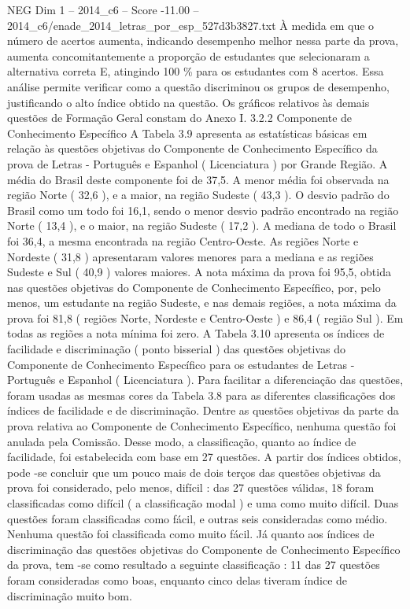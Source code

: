 \begin{textsample}{NEG Dim 1 – 2014\_c6 – Score -11.00 – 2014\_c6/enade\_2014\_letras\_por\_esp\_527d3b3827.txt}
À medida em que o número de acertos aumenta, indicando desempenho melhor nessa parte da prova, aumenta concomitantemente a proporção de estudantes que selecionaram a alternativa correta E, atingindo 100 \% para os estudantes com 8 acertos.
Essa análise permite verificar como a questão discriminou os grupos de desempenho, justificando o alto índice obtido na questão.
Os gráficos relativos às demais questões de Formação Geral constam do Anexo I. 3.2.2 Componente de Conhecimento Específico A Tabela 3.9 apresenta as estatísticas básicas em relação às questões objetivas do Componente de Conhecimento Específico da prova de Letras - Português e Espanhol ( Licenciatura ) por Grande Região.
A média do Brasil deste componente foi de 37,5.
A menor média foi observada na região Norte ( 32,6 ), e a maior, na região Sudeste ( 43,3 ).
O desvio padrão do Brasil como um todo foi 16,1, sendo o menor desvio padrão encontrado na região Norte ( 13,4 ), e o maior, na região Sudeste ( 17,2 ).
A mediana de todo o Brasil foi 36,4, a mesma encontrada na região Centro-Oeste.
As regiões Norte e Nordeste ( 31,8 ) apresentaram valores menores para a mediana e as regiões Sudeste e Sul ( 40,9 ) valores maiores.
A nota máxima da prova foi 95,5, obtida nas questões objetivas do Componente de Conhecimento Específico, por, pelo menos, um estudante na região Sudeste, e nas demais regiões, a nota máxima da prova foi 81,8 ( regiões Norte, Nordeste e Centro-Oeste ) e 86,4 ( região Sul ).
Em todas as regiões a nota mínima foi zero.
A Tabela 3.10 apresenta os índices de facilidade e discriminação ( ponto bisserial ) das questões objetivas do Componente de Conhecimento Específico para os estudantes de Letras - Português e Espanhol ( Licenciatura ).
Para facilitar a diferenciação das questões, foram usadas as mesmas cores da Tabela 3.8 para as diferentes classificações dos índices de facilidade e de discriminação.
Dentre as questões objetivas da parte da prova relativa ao Componente de Conhecimento Específico, nenhuma questão foi anulada pela Comissão.
Desse modo, a classificação, quanto ao índice de facilidade, foi estabelecida com base em 27 questões.
A partir dos índices obtidos, pode -se concluir que um pouco mais de dois terços das questões objetivas da prova foi considerado, pelo menos, difícil : das 27 questões válidas, 18 foram classificadas como difícil ( a classificação modal ) e uma como muito difícil.
Duas questões foram classificadas como fácil, e outras seis consideradas como médio.
Nenhuma questão foi classificada como muito fácil.
Já quanto aos índices de discriminação das questões objetivas do Componente de Conhecimento Específico da prova, tem -se como resultado a seguinte classificação : 11 das 27 questões foram consideradas como boas, enquanto cinco delas tiveram índice de discriminação muito bom.

\end{textsample}
